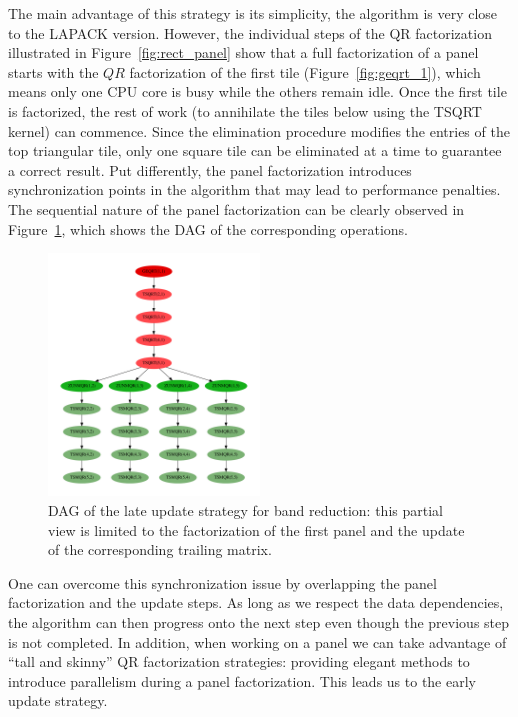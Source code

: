 The main advantage of this strategy is its simplicity,
the algorithm is very close to the LAPACK version.
However,
the individual steps of the QR factorization illustrated in
Figure~\ref{fig:rect_panel}
show that a full factorization of a panel
starts with the $QR$ factorization of the first tile
(Figure~\ref{fig:geqrt_1}), which means only one CPU core is busy
while the others remain idle.
Once the first tile is factorized, the
rest of work (to annihilate the tiles below using the TSQRT
kernel) can commence.
Since the elimination procedure modifies the entries of the
top triangular tile, only one square tile can be eliminated at a time
to guarantee a correct result.
Put differently,
the panel factorization introduces synchronization points
in the algorithm that
may lead to performance penalties.
The sequential nature of the panel factorization can be
clearly observed in Figure~\ref{fig:dag_panel},
which shows the DAG of the corresponding operations.

\begin{figure}
  \begin{center}
    \includegraphics[width=0.5\textwidth]{fig/dag}
  \end{center}
  \caption{DAG of the late update strategy for band reduction:
    this partial view is limited to the factorization of the first panel and
    the update of the corresponding trailing matrix.}
  \label{fig:dag_panel}
\end{figure}

One can overcome this synchronization issue by overlapping the panel
factorization and the update steps.
As long as we respect the data dependencies, the algorithm can then progress onto the next step even
though the previous step is not completed.
In addition, when working on a panel we can
take advantage of ``tall and skinny'' QR factorization
strategies:
providing elegant methods to introduce parallelism
during a panel factorization.
This leads us to the early update strategy.

